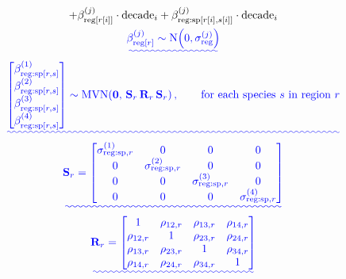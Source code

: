 \documentclass[9pt,twocolumn,twoside]{pnas-new}
\providecommand{\DIFadd}[1]{{\protect\color{blue}\uwave{#1}}} %
\providecommand{\DIFaddend}{} %
\providecommand{\DIFdelbegin}{} %
\begin{document}
{\begin{gather}
{+ \beta_{\text{reg}[r[i]]}^{(j)} \cdot \text{decade}_{i}
+ \beta_{\text{reg:sp}[r[i],s[i]]}^{(j)} \cdot \text{decade}_{i} \label{eq:linearpred}
}\\
\DIFadd{\beta_{\text{reg}[r]}^{(j)} \sim 
\operatorname{N}\!\left(0,\sigma_{\text{reg}}^{(j)}\right) \label{eq:regionslope}
}\\
\DIFadd{\begin{bmatrix}
\beta_{\text{reg:sp}[r,s]}^{(1)} \\
\beta_{\text{reg:sp}[r,s]}^{(2)} \\
\beta_{\text{reg:sp}[r,s]}^{(3)} \\
\beta_{\text{reg:sp}[r,s]}^{(4)}
\end{bmatrix}
\sim 
\operatorname{MVN}\!\left(
\mathbf{0},\,
\mathbf{S}_{r}\,\mathbf{R}_{r}\,\mathbf{S}_{r}
\right),
\qquad \text{for each species}~s~\text{in region}~r \label{eq:mvn}
}\\
\DIFadd{\mathbf{S}_{r} =
\begin{bmatrix}
\sigma^{(1)}_{\text{reg:sp},r} & 0 & 0 & 0 \\
0 & \sigma^{(2)}_{\text{reg:sp},r} & 0 & 0 \\
0 & 0 & \sigma^{(3)}_{\text{reg:sp},r} & 0 \\
0 & 0 & 0 & \sigma^{(4)}_{\text{reg:sp},r}
\end{bmatrix} \label{eq:sdmatrix}
}\\
\DIFadd{\mathbf{R}_{r} =
\begin{bmatrix}
1 & \rho_{12,r} & \rho_{13,r} & \rho_{14,r} \\
\rho_{12,r} & 1 & \rho_{23,r} & \rho_{24,r} \\
\rho_{13,r} & \rho_{23,r} & 1 & \rho_{34,r} \\
\rho_{14,r} & \rho_{24,r} & \rho_{34,r} & 1
\end{bmatrix} \label{eq:corrmatrix}
}\end{gather}\DIFaddend 
\DIFdelbegin %

}
\end{document}
